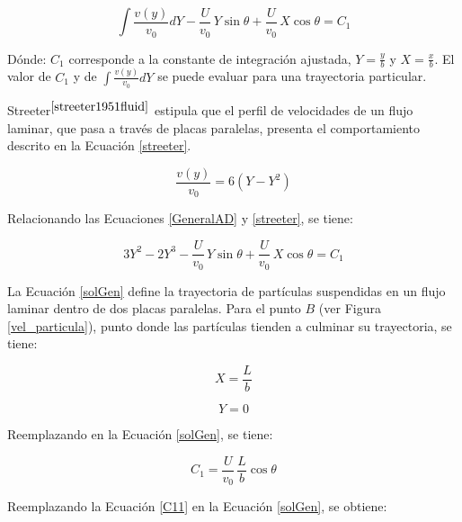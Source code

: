 \begin{equation}
	\int \frac{v (y)}{v_0} dY - \frac{U}{v_0} \, Y \sin \theta + \frac{U}{v_0} \, X \cos \theta = C_1
	\label{GeneralAD}
\end{equation}

\noindent
\justify

D\'onde: $C_1$ corresponde a la constante de integraci\'on ajustada, $Y = \frac{y}{b}$ y $X = \frac{x}{b}$. El valor de $C_1$ y de $\int \frac{v (y)}{v_0} dY$ se puede evaluar para una trayectoria particular.

\noindent
\justify

Streeter$^{\cite{streeter1951fluid}}$ estipula que el perfil de velocidades de un flujo laminar, que pasa a trav\'es de placas paralelas, presenta el comportamiento descrito en la Ecuaci\'on \ref{streeter}.

\begin{equation}
	\frac{v (y)}{v_0} = 6 \left(Y - Y^2 \right)
	\label{streeter}
\end{equation}

\noindent
\justify

Relacionando las Ecuaciones \ref{GeneralAD} y \ref{streeter}, se tiene:

\begin{equation}
	3 Y ^2 - 2 Y ^3 - \frac{U}{v_0} \, Y \sin \theta + \frac{U}{v_0} \, X \cos \theta = C_1
	\label{solGen} 
\end{equation}

\noindent
\justify

La Ecuaci\'on \ref{solGen} define la trayectoria de part\'iculas suspendidas en un flujo laminar dentro de dos placas paralelas. Para el punto $B$ (ver Figura \ref{vel_particula}), punto donde las part\'iculas tienden a culminar su trayectoria, se tiene:

\begin{equation*}
	X = \frac{L}{b}
\end{equation*}

\begin{equation*}
	Y = 0
\end{equation*}

Reemplazando en la Ecuaci\'on \ref{solGen}, se tiene:

\begin{equation}
	C_1 = \frac{U}{v_0} \, \frac{L}{b} \cos \theta
	\label{C11}
\end{equation}

\noindent
\justify

Reemplazando la Ecuaci\'on \ref{C11} en la Ecuaci\'on \ref{solGen}, se obtiene:


